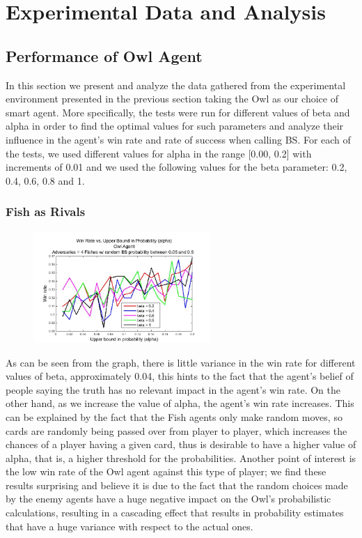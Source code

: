 \documentclass[a4paper,11pt]{article}
\begin{document}
\section{Experimental Data and Analysis}

\subsection{Performance of Owl Agent}
In this section we present and analyze the data gathered from the experimental environment presented in the previous section taking the Owl as our choice of smart agent. More specifically, the tests were run for different values of beta and alpha in order to find the optimal values for such parameters and analyze their influence in the agent’s win rate and rate of success when calling BS. For each of the tests, we used different values for alpha in the range [0.00, 0.2] with increments of 0.01 and we used the following values for the beta parameter: 0.2, 0.4, 0.6, 0.8 and 1.

\subsubsection{Fish as Rivals}

\begin{figure}
\includegraphics[width=0.6\textwidth]{owl_vs_fish_upperbBoundProb}
\caption{}
\end{figure}
	As can be seen from the graph, there is little variance in the win rate for different values of beta, approximately 0.04, this hints to the fact that the agent’s belief of people saying the truth has no relevant impact in the agent’s win rate. On the other hand, as we increase the value of alpha, the agent’s win rate increases. This can be explained by the fact that the Fish agents only make random moves, so cards are randomly being passed over from player to player, which increases the chances of a player having a given card, thus is desirable to have a higher value of alpha, that is, a higher threshold for the probabilities. Another point of interest is the low win rate of the Owl agent against this type of player; we find these results surprising and believe it is due to the fact that the random choices made by the enemy agents have a huge negative impact on the Owl’s probabilistic calculations, resulting in a cascading effect that results in probability estimates that have a huge variance with respect to the actual ones.
\end{document}
